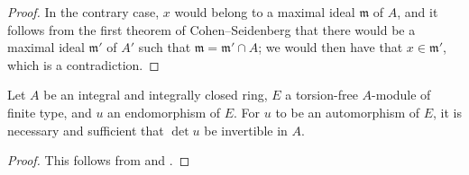 \begin{proof}
In the contrary case, $x$ would belong to a maximal ideal $\mathfrak{m}$ of $A$, and it follows from the first theorem of Cohen--Seidenberg \cite[t.~I, p.~257, th.~3]{I-13} that there would be a maximal ideal $\mathfrak{m}'$ of $A'$ such that $\mathfrak{m}=\mathfrak{m}'\cap A$;
we would then have that $x\in\mathfrak{m}'$, which is a contradiction.
\end{proof}

\begin{corollary}[6.4.6]
\label{II.6.4.6}
Let $A$ be an integral and integrally closed ring, $E$ a torsion-free $A$-module of finite type, and $u$ an endomorphism of $E$.
For $u$ to be an automorphism of $E$, it is necessary and sufficient that $\det u$ be invertible in $A$.
\end{corollary}

\begin{proof}
This follows from  and .
\end{proof}

